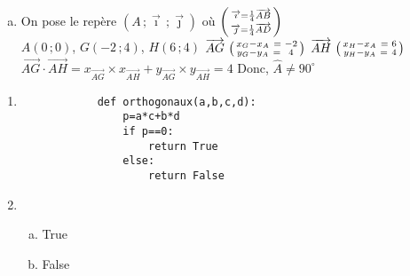 \documentclass[12pt, a4paper]{article}
\begin{document}
\begin{Exercise}[number={74}]
    \begin{enumerate}[a)]
     \item On pose le repère $(A\, ;\overrightarrow{\imath}\,;\overrightarrow{\jmath})$ où $\begin{psmallmatrix}\overrightarrow{\imath}=\frac{1}{4}\overrightarrow{AB}\\\overrightarrow{\jmath}=\frac{1}{4}\overrightarrow{AD}\end{psmallmatrix}$ \smallskip \\
        $A(0\,;0)$, $G(-2\,;4)$, $H(6\,;4)$ \medbreak
        $\overrightarrow{AG}\ \begin{psmallmatrix}x_G-x_A\ =& -2\\y_G-y_A\ =& 4\end{psmallmatrix}$ \smallbreak $\overrightarrow{AH}\ \begin{psmallmatrix}x_H-x_A\ =& 6\\y_H-y_A\ =& 4\end{psmallmatrix}$ \medbreak
        $\overrightarrow{AG}\cdot\overrightarrow{AH}=x_{\overrightarrow{AG}}\times x_{\overrightarrow{AH}}+y_{\overrightarrow{AG}}\times y_{\overrightarrow{AH}}=4$ \qquad Donc, $\widehat{A}\neq 90^{\circ}$
    \end{enumerate}
\end{Exercise}

\begin{Exercise}[number={78}]
    \begin{enumerate}[1)]
        \item \begin{verbatim}
            def orthogonaux(a,b,c,d):
                p=a*c+b*d
                if p==0:
                    return True
                else:
                    return False
        \end{verbatim}
        \item \begin{enumerate}[a)]
                    \item True
                    \item False
                    \end{enumerate}
    \end{enumerate}
\end{Exercise}
\end{document}
